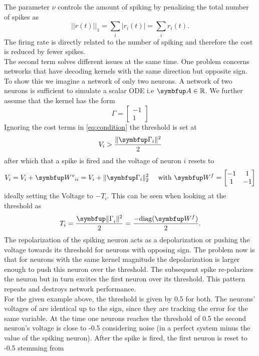 The parameter $\nu$ controls the amount of spiking by penalizing the total number of spikes as
\begin{equation}
||r(t)||_1 = \sum_i|r_i(t)| = \sum_i r_i(t).
\end{equation}
The firing rate is directly related to the number of spiking and therefore the cost is reduced by fewer spikes.\\
The second term solves different issues at the same time. One problem concerns networks that have decoding kernels with the same direction but opposite sign. To show this we imagine a network of only two neurons. A network of two neurons is sufficient to simulate a scalar \ac{ODE} i.e $\bmu{A}\in \mathbb{R}$. We further assume that the kernel has the form
\begin{equation}
\Gamma = \begin{bmatrix}
-1\\1
\end{bmatrix}
\end{equation}
Ignoring the cost terms in \cref{eq:condition} the threshold is set at
\begin{equation}
V_i > \frac{\|\bmu{\Gamma}_i\|^2}{2}
\end{equation}
after which that a spike is fired and the voltage of neuron $i$  resets to
\begin{equation}
V_i = V_i + \bmu{W^s}_{ii} = V_i + \|\bmu{\Gamma}_i\|^2_2 \quad \text{ with } \bmu{W^f} = \begin{bmatrix}
-1& 1\\
1& -1
\end{bmatrix}
\end{equation}
ideally setting the Voltage to $-T_i$. This can be seen when looking at the threshold as
\begin{equation}
T_i =\frac{ \bmu{\|\Gamma}_i\|^2}{2}= \frac{-\text{diag}(\bmu{W^f})}{2}.
\end{equation}
The repolarization of the spiking neuron acts as a depolarization or pushing the voltage towards its threshold for neurons with opposing sign. The problem now is that for neurons with the same kernel magnitude the depolarization is larger enough to push this neuron over the threshold. The subsequent spike re-polarizes the neuron but in turn excites the first neuron over its threshold. This pattern repeats and destroys network performance.\\
For the given example above, the threshold is given by 0.5 for both. The neurons' voltages of are identical up to the sign, since they are tracking the error for the same variable. At the time one neurons reaches the threshold of 0.5 the second neuron's voltage is close to -0.5 considering noise (in a perfect system minus the value of the spiking neuron). After the spike is fired, the first neuron is reset to -0.5 stemming from
